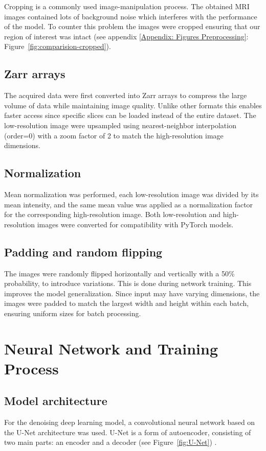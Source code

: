 \documentclass[twocolumn]{article}
\begin{document}
Cropping is a commonly used image-manipulation process. The obtained MRI images contained lots of background noise which interferes with the performance of the model. 
To counter this problem the images were cropped ensuring that our region of interest was intact (see appendix \ref{Appendix: Figures Preprocessing}: Figure~\ref{fig:comparision-cropped}).  

\subsection{Zarr arrays}

The acquired data were first converted into Zarr arrays to compress the large volume of data while maintaining image quality. 
Unlike other formats this enables faster access since specific slices can be loaded instead of the entire dataset.
The low-resolution image were upsampled using nearest-neighbor interpolation (order=0) with a zoom factor of 2 to match the high-resolution image dimensions. 

\subsection{Normalization}

Mean normalization was performed, each low-resolution image was divided by its mean intensity, and the same mean value was applied as a normalization factor for the corresponding high-resolution image.  
Both low-resolution and high-resolution images were converted for compatibility with PyTorch models.

\subsection{Padding and random flipping}
The images were randomly flipped horizontally and vertically with a 50\% probability, to introduce variations.
This is done during network training. 
This improves the model generalization. Since input may have varying dimensions, the images were padded to match the largest width and height within each batch, ensuring uniform sizes for batch processing.


\section{Neural Network and Training Process}
\subsection{Model architecture}
For the denoising deep learning model, a convolutional neural network based on the U-Net architecture was used. 
U-Net is a form of autoencoder, consisting of two main parts: an encoder and a decoder (see Figure~\ref{fig:U-Net}) \cite{ronneberger2015unet}.
\end{document}
